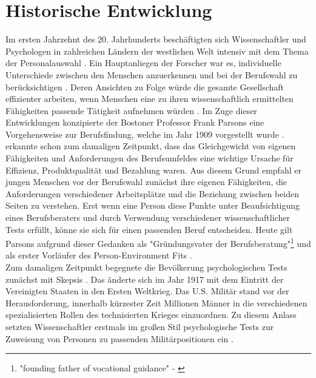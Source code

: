 \section{Historische Entwicklung}
\label{ch:personEnvironmentFit:historisches}
Im ersten Jahrzehnt des 20. Jahrhunderts beschäftigten sich Wissenschaftler und Psychologen in zahlreichen Ländern der westlichen Welt intensiv mit dem Thema der Personalauswahl \cite[S. 1]{salgado:2001}. Ein Hauptanliegen der Forscher war es, individuelle Unterschiede zwischen den Menschen anzuerkennen und bei der Berufswahl zu berücksichtigen \cite[S. 2ff.]{stern:1900}. Deren Ansichten zu Folge würde die gesamte Gesellschaft effizienter arbeiten, wenn Menschen eine zu ihren wissenschaftlich ermittelten Fähigkeiten passende Tätigkeit aufnehmen würden \cite[S.2]{kevles:1968}\cite[S. 3]{parsons:1909}. Im Zuge dieser Entwicklungen konzipierte der Bostoner Professor Frank Parsons eine Vorgehensweise zur Berufsfindung, welche im Jahr 1909 vorgestellt wurde \cite[S. 1]{su:2015}. \textcite[S. 5ff.]{parsons:1909} erkannte schon zum damaligen Zeitpunkt, dass das Gleichgewicht von eigenen Fähigkeiten und Anforderungen des Berufsumfeldes eine wichtige Ursache für Effizienz, Produktqualität und Bezahlung waren. Aus diesem Grund empfahl er jungen Menschen vor der Berufswahl zunächst ihre eigenen Fähigkeiten, die Anforderungen verschiedener Arbeitsplätze und die Beziehung zwischen beiden Seiten zu verstehen. Erst wenn eine Person diese Punkte unter Beaufsichtigung eines Berufsberaters und durch Verwendung verschiedener wissenschaftlicher Tests erfüllt, könne sie sich für einen passenden Beruf entscheiden. Heute gilt Parsons aufgrund dieser Gedanken als "Gründungsvater der Berufsberatung"\footnote{"founding father of vocational guidance" - \textcite[S. 3]{porfeli:2009}} \cite[S. 3]{porfeli:2009} und als erster Vorläufer des Person-Environment Fits \cite[S. 2]{edwards:2008}.\\
Zum damaligen Zeitpunkt begegnete die Bevölkerung psychologischen Tests zunächst mit Skepsis \cite[S. 2]{kevles:1968}. Das änderte sich im Jahr 1917 mit dem Eintritt der Vereinigten Staaten in den Ersten Weltkrieg. Das U.S. Militär stand vor der Herausforderung, innerhalb kürzester Zeit Millionen Männer in die verschiedenen spezialisierten Rollen des technisierten Krieges einzuordnen. Zu diesem Anlass setzten Wissenschaftler erstmals im großen Stil psychologische Tests zur Zuweisung von Personen zu passenden Militärpositionen ein \cite[S. 2ff.]{kevles:1968}. \\
